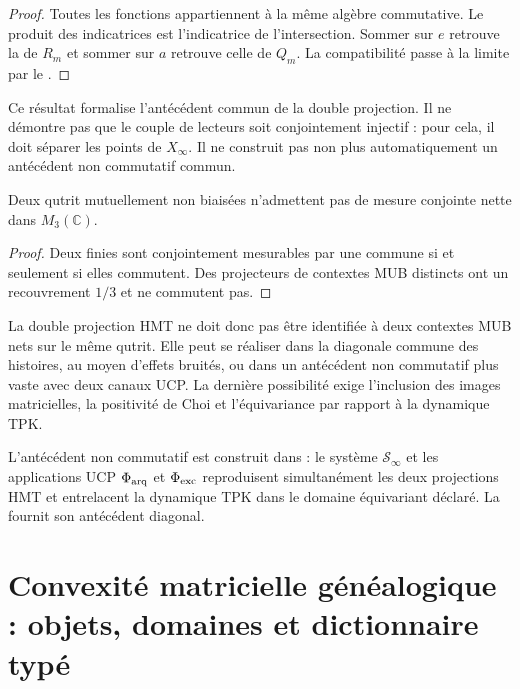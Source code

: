 \begin{proof}
Toutes les fonctions appartiennent à la même algèbre commutative. Le produit
des indicatrices est l'indicatrice de l'intersection. Sommer sur $e$ retrouve
la \PVM de $R_m$ et sommer sur $a$ retrouve celle de $Q_m$. La compatibilité passe
à la limite par le .
\end{proof}

Ce résultat formalise l'antécédent commun de la double projection. Il ne
démontre pas que le couple de lecteurs soit conjointement injectif : pour cela, il doit
séparer les points de $X_\infty$. Il ne construit pas non plus automatiquement un antécédent
non commutatif commun.

\begin{proposition}
Deux \PVM qutrit mutuellement non biaisées n'admettent pas de mesure conjointe nette
dans $M_3(\mathbb C)$.
\end{proposition}

\begin{proof}
Deux \PVM finies sont conjointement mesurables par une \PVM commune si et seulement si
elles commutent. Des projecteurs de contextes MUB distincts ont un recouvrement $1/3$ et
ne commutent pas.
\end{proof}


La double projection HMT ne doit donc pas être identifiée à deux contextes
MUB nets sur le même qutrit. Elle peut se réaliser dans la diagonale commune des
histoires, au moyen d'effets bruités, ou dans un antécédent non commutatif plus
vaste avec deux canaux UCP. La dernière possibilité exige l'inclusion des images
matricielles, la positivité de Choi et l'équivariance par rapport à la dynamique TPK.

\begin{workbox}[fontupper=\footnotesize,fonttitle=\bfseries\footnotesize,
  boxsep=1pt,left=4pt,right=4pt,top=0pt,bottom=0pt,
  toptitle=1pt,bottomtitle=1pt]
L'antécédent non commutatif est construit dans
 : le système $\mathcal S_\infty$ et les applications UCP
$\Phi_{\rm arq}$ et $\Phi_{\rm exc}$ reproduisent simultanément les deux
projections HMT et entrelacent la dynamique TPK dans le domaine équivariant
déclaré. La 
fournit son antécédent diagonal.
\end{workbox}
\fi


\section{Convexité matricielle généalogique : objets, domaines et dictionnaire
typé}

